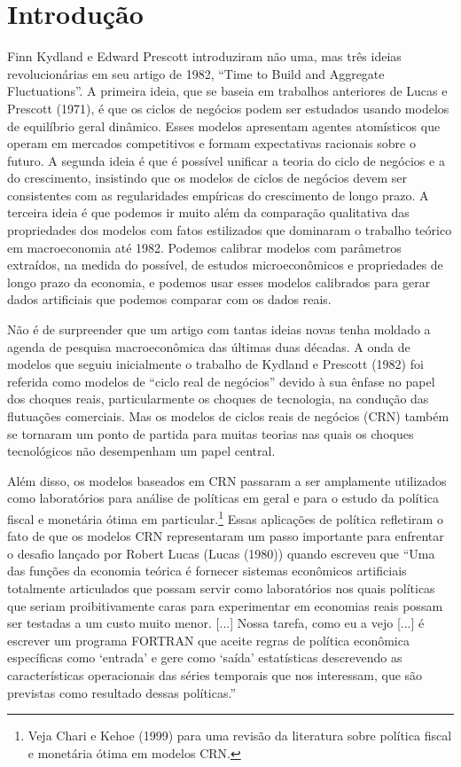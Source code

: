 \documentclass[12pt]{article}
\begin{document}
\newpage

\section{Introdução}

Finn Kydland e Edward Prescott introduziram não uma, mas três ideias revolucionárias em seu artigo de 1982, “Time to Build and Aggregate Fluctuations”. A primeira ideia, que se baseia em trabalhos anteriores de Lucas e Prescott (1971), é que os ciclos de negócios podem ser estudados usando modelos de equilíbrio geral dinâmico. Esses modelos apresentam agentes atomísticos que operam em mercados competitivos e formam expectativas racionais sobre o futuro. A segunda ideia é que é possível unificar a teoria do ciclo de negócios e a do crescimento, insistindo que os modelos de ciclos de negócios devem ser consistentes com as regularidades empíricas do crescimento de longo prazo. A terceira ideia é que podemos ir muito além da comparação qualitativa das propriedades dos modelos com fatos estilizados que dominaram o trabalho teórico em macroeconomia até 1982. Podemos calibrar modelos com parâmetros extraídos, na medida do possível, de estudos microeconômicos e propriedades de longo prazo da economia, e podemos usar esses modelos calibrados para gerar dados artificiais que podemos comparar com os dados reais.

Não é de surpreender que um artigo com tantas ideias novas tenha moldado a agenda de pesquisa macroeconômica das últimas duas décadas. A onda de modelos que seguiu inicialmente o trabalho de Kydland e Prescott (1982) foi referida como modelos de “ciclo real de negócios” devido à sua ênfase no papel dos choques reais, particularmente os choques de tecnologia, na condução das flutuações comerciais. Mas os modelos de ciclos reais de negócios (CRN) também se tornaram um ponto de partida para muitas teorias nas quais os choques tecnológicos não desempenham um papel central.

Além disso, os modelos baseados em CRN passaram a ser amplamente utilizados como laboratórios para análise de políticas em geral e para o estudo da política fiscal e monetária ótima em particular.\footnote{Veja Chari e Kehoe (1999) para uma revisão da literatura sobre política fiscal e monetária ótima em modelos CRN.} Essas aplicações de política refletiram o fato de que os modelos CRN representaram um passo importante para enfrentar o desafio lançado por Robert Lucas (Lucas (1980)) quando escreveu que “Uma das funções da economia teórica é fornecer sistemas econômicos artificiais totalmente articulados que possam servir como laboratórios nos quais políticas que seriam proibitivamente caras para experimentar em economias reais possam ser testadas a um custo muito menor. [...] Nossa tarefa, como eu a vejo [...] é escrever um programa FORTRAN que aceite regras de política econômica específicas como ‘entrada’ e gere como ‘saída’ estatísticas descrevendo as características operacionais das séries temporais que nos interessam, que são previstas como resultado dessas políticas.”
\end{document}
